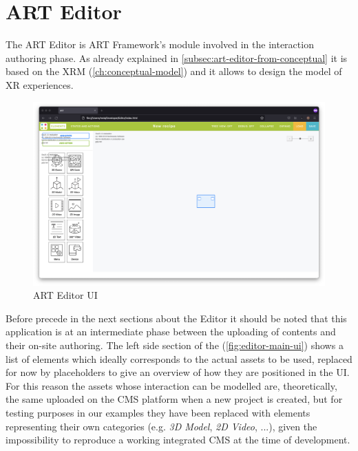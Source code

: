 \section{ART Editor}
\label{sec:art-editor}

The ART Editor is ART Framework's module involved in the interaction authoring phase. As already explained in \autoref{subsec:art-editor-from-conceptual} it is based on the XRM (\autoref{ch:conceptual-model}) and it allows to design the model of XR experiences.
\begin{figure}[h]
    \centering
    \includegraphics[width = \linewidth]{Figures/Editor/main-UI.png}
    \caption{ART Editor UI}
    \label{fig:editor-main-ui}
\end{figure}

Before precede in the next sections about the Editor it should be noted that this application is at an intermediate phase between the uploading of contents and their on-site authoring. The left side section of the (\autoref{fig:editor-main-ui}) shows a list of elements which ideally corresponds to the actual assets to be used, replaced for now by placeholders to give an overview of how they are positioned in the UI. For this reason the assets whose interaction can be modelled are, theoretically, the same uploaded on the CMS platform when a new project is created, but for testing purposes in our examples they have been replaced with elements representing their own categories (e.g. \emph{3D Model}, \emph{2D Video}, ...), given the impossibility to reproduce a working integrated CMS at the time of development.





